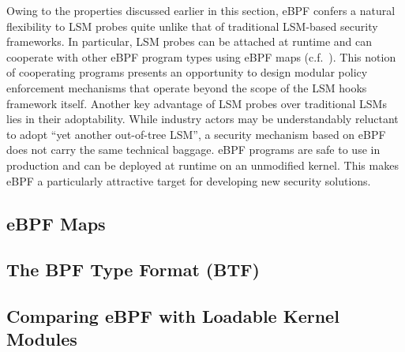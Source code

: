 Owing to the properties discussed earlier in this section, eBPF confers a natural
flexibility to LSM probes quite unlike that of traditional LSM-based security frameworks.
In particular, LSM probes can be attached at runtime and can cooperate with other eBPF
program types using eBPF maps (c.f.~). This notion of cooperating
programs presents an opportunity to design modular policy enforcement mechanisms that
operate beyond the scope of the LSM hooks framework itself.  Another key advantage of LSM
probes over traditional LSMs lies in their adoptability.  While industry actors may be
understandably reluctant to adopt \enquote{yet another out-of-tree LSM}, a security
mechanism based on eBPF does not carry the same technical baggage.  eBPF programs are safe
to use in production and can be deployed at runtime on an unmodified kernel.  This makes
eBPF a particularly attractive target for developing new security solutions.

\subsection{eBPF Maps}%
\label{ss:bpf-maps-bg}

\subsection{The BPF Type Format (BTF)}%
\label{ss:btf-bg}

\subsection{Comparing eBPF with Loadable Kernel Modules}%
\label{ss:bpf-vs-modules}

